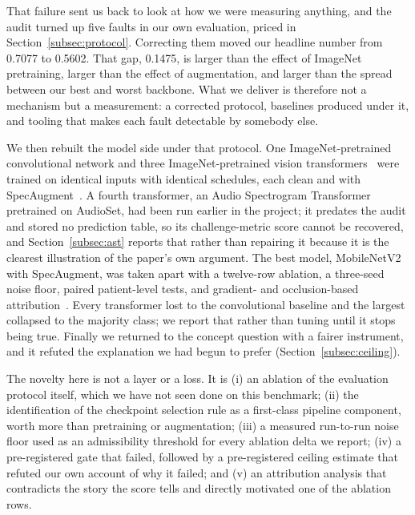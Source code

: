 \documentclass[journal,onecolumn]{IEEEtran}
\begin{document}
That failure sent us back to look at how we were measuring anything, and the audit turned
up five faults in our own evaluation, priced in Section~\ref{subsec:protocol}. Correcting
them moved our headline number from 0.7077 to 0.5602. That gap, 0.1475, is larger than the
effect of ImageNet pretraining, larger than the effect of augmentation, and larger than the
spread between our best and worst backbone. What we deliver is therefore not a mechanism
but a measurement: a corrected protocol, baselines produced under it, and tooling that
makes each fault detectable by somebody else.

We then rebuilt the model side under that protocol. One ImageNet-pretrained convolutional
network and three ImageNet-pretrained vision
transformers~\cite{dosovitskiy2021vit,liu2021swin,touvron2021deit} were trained on identical
inputs with identical schedules, each clean and with SpecAugment~\cite{park2019specaugment}. A
fourth transformer, an Audio Spectrogram Transformer~\cite{gong2021ast} pretrained on AudioSet,
had been run earlier in the project; it predates the audit and stored no prediction table, so
its challenge-metric score cannot be recovered, and Section~\ref{subsec:ast} reports that
rather than repairing it because it is the clearest illustration of the paper's own argument.
The best model, MobileNetV2~\cite{sandler2018mobilenetv2} with SpecAugment, was taken apart
with a twelve-row ablation, a three-seed noise floor, paired patient-level tests, and gradient-
and occlusion-based attribution~\cite{selvaraju2017gradcam}. Every transformer lost to the
convolutional baseline and the largest collapsed to the majority class; we report that rather
than tuning until it stops being true. Finally we returned to the concept question with a
fairer instrument, and it refuted the explanation we had begun to prefer
(Section~\ref{subsec:ceiling}).

The novelty here is not a layer or a loss. It is (i) an ablation of the evaluation protocol
itself, which we have not seen done on this benchmark; (ii) the identification of the
checkpoint selection rule as a first-class pipeline component, worth more than pretraining
or augmentation; (iii) a measured run-to-run noise floor used as an admissibility threshold
for every ablation delta we report; (iv) a pre-registered gate that failed, followed by a
pre-registered ceiling estimate that refuted our own account of why it failed; and (v) an
attribution analysis that contradicts the story the score tells and directly motivated one
of the ablation rows.
\end{document}
